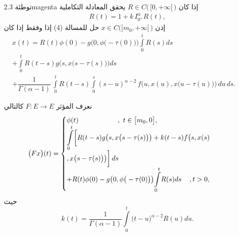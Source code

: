 \documentclass[dvipsnames,mathserif]{beamer}
\begin{document}
\begin{frame}
\vspace{-0.6cm}
\begin{box3}{ توطئة 2.3}{magenta}
 {\LARGE{}}
إذا كان 
$R \in C\big(\, {\big[0, + \infty \big[} \,\big)$
يحقق المعادلة التكاملية 
\begin{align}
\label{4.3}
R(t) = 1 + k\,I_{{0^ + }}^\alpha R(t),
\end{align}
إذن
$x \in C\big( {\big[m_0, + \infty \big[} \,\big)$
حل للمسالة (4)
إذا وفقط إذا كان 
\begin{align*}
 &x(t) = R(t)\phi (0) - g\big(0,\phi \big( - \tau (0)\big)\big){\displaystyle \int\limits_0^t }R(s)ds\\
 & +{\displaystyle \int\limits_0^t }{R(t - s)g\big(s,x\big(s - \tau (s)\big)\big)ds}  \\
&+ \dfrac{1}{{\Gamma (\alpha  - 1)}}\,{\displaystyle\int\limits_0^t} {R(t - s){\displaystyle \int\limits_0^s }{{{(s - u)}^{\alpha  - 2}}\,f\big(u,x(u),x} } \big(u - \tau (u)\big)\big)\,du\,ds.\,~~~~~~~~
\end{align*}
\end{box3}
\end{frame}
\begin{frame}
\begin{tcolorbox}[enhanced,colback=yellow!10!white,boxrule=0pt,frame hidden,
borderline north={1mm}{-2mm}{red},
borderline south={1mm}{-2mm}{blue},
borderline west={1mm}{-2mm}{green},
borderline east={1mm}{-2mm}{yellow}]
نعرف المؤثر 
$F:E \to E$
كالتالي
\begin{align*}
\hspace{-0.5cm}
\big(Fx\big)(t)=
\begin{cases}
\phi(t) \hspace{2cm} ,\,\,t\in \big[m_0 ,0\big],\\
{\displaystyle\int\limits_0^t }\bigg[ R(t - s)g\big(s,x\big(s - \tau (s)\big)\big) + k(t - s)f\big(s,x(s)\\
,x\big(s - \tau (s)\big)\big) \bigg]  \,ds\\
 + R(t)\phi (0) - g\big(0,\phi \big( - \tau (0)\big)\big){\displaystyle\int\limits_0^t} {R(s)ds} 
\,\,\,\,\,\,\,, t>0,
\end{cases}
\end{align*}
حيث  
$$k(t)=\dfrac{1}{\Gamma(\alpha-1)}\int\limits_{0}^{t} {\big(t-u\big)}^{\alpha-2} R(u)du.$$
\end{tcolorbox}
\end{frame}
\end{document}
